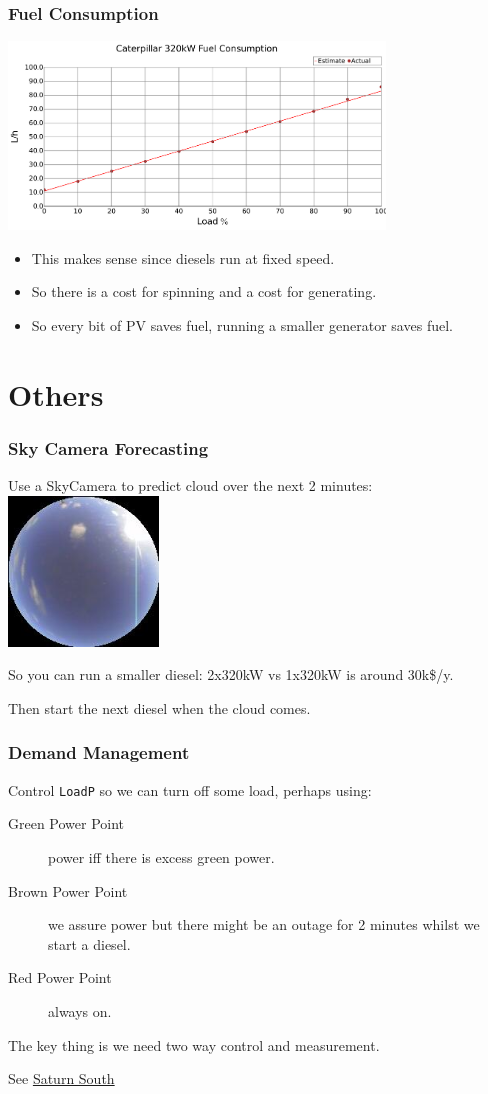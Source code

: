 \documentclass[a4paper,handout]{beamer}
\begin{document}
\begin{frame}\frametitle{Fuel Consumption}
\includegraphics[width=10cm]{limits/figFuelCurve2.pdf}
\pause

\begin{itemize}
\item This makes sense since diesels run at fixed speed.
\pause
\item So there is a cost for spinning and a cost for generating.
\pause
\item So every bit of PV saves fuel, running a smaller generator
  saves fuel.
\end{itemize}
\end{frame}

\section{Others}
\begin{frame}\frametitle{Sky Camera Forecasting}
Use a SkyCamera to predict cloud over the next 2 minutes:
\pause
\includegraphics[width=4cm]{batch-2014-07-28T165557+0930-basis.jpg}
\pause

So you can run a smaller diesel: 2x320kW vs 1x320kW is around 30k\$/y.
\pause

Then start the next diesel when the cloud comes.
\end{frame}

\begin{frame}\frametitle{Demand Management}
Control \texttt{LoadP} so we can turn off some load, perhaps using:

\begin{description}
\item[Green Power Point] power iff there is excess green power.
\item[Brown Power Point] we assure power but there might be an outage
  for 2 minutes whilst we start a diesel.
\item[Red Power Point] always on.
\end{description}

The key thing is we need two way control and measurement.

See \href{http://www.saturnsouth.com}{Saturn South}
\end{frame}
\end{document}
